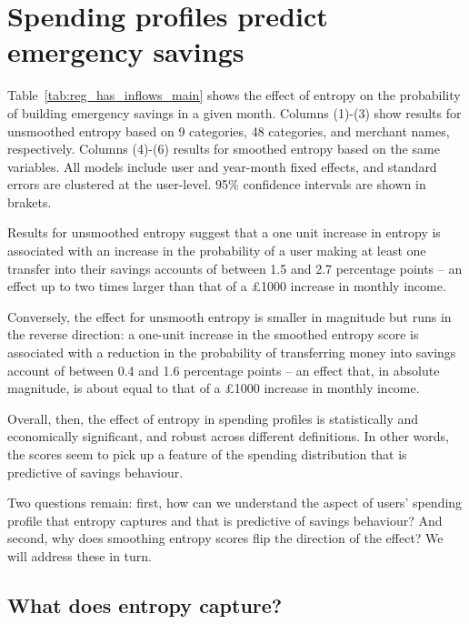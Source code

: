 
\section{Spending profiles predict emergency savings}%
\label{sec:results}

Table~\ref{tab:reg_has_inflows_main} shows the effect of entropy on the
probability of building emergency savings in a given month. Columns (1)-(3)
show results for unsmoothed entropy based on 9 categories, 48 categories, and
merchant names, respectively. Columns (4)-(6) results for smoothed entropy
based on the same variables. All models include user and year-month fixed
effects, and standard errors are clustered at the user-level. 95\% confidence
intervals are shown in brakets.



Results for unsmoothed entropy suggest that a one unit increase in entropy is
associated with an increase in the probability of a user making at least one
transfer into their savings accounts of between 1.5 and 2.7 percentage points
-- an effect up to two times larger than that of a \pounds1000 increase in
monthly income.

Conversely, the effect for unsmooth entropy is smaller in magnitude but runs in
the reverse direction: a one-unit increase in the smoothed entropy score is
associated with a reduction in the probability of transferring money into
savings account of between 0.4 and 1.6 percentage points -- an effect that, in
absolute magnitude, is about equal to that of a \pounds1000 increase in monthly
income.

Overall, then, the effect of entropy in spending profiles is statistically and
economically significant, and robust across different definitions. In other
words, the scores seem to pick up a feature of the spending distribution that
is predictive of savings behaviour.

Two questions remain: first, how can we understand the aspect of users'
spending profile that entropy captures and that is predictive of savings
behaviour? And second, why does smoothing entropy scores flip the direction of
the effect? We will address these in turn.


\subsection{What does entropy capture?}%
\label{sub:what_does_entropy_capture_}

